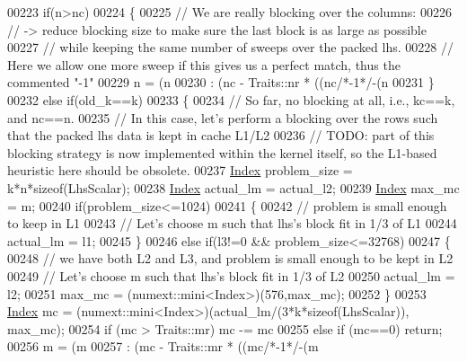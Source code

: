 \begin{DoxyCode}
00223     \textcolor{keywordflow}{if}(n>nc)
00224     \{
00225       \textcolor{comment}{// We are really blocking over the columns:}
00226       \textcolor{comment}{// -> reduce blocking size to make sure the last block is as large as possible}
00227       \textcolor{comment}{//    while keeping the same number of sweeps over the packed lhs.}
00228       \textcolor{comment}{//    Here we allow one more sweep if this gives us a perfect match, thus the commented "-1"}
00229       n = (n%
00230                     : (nc - Traits::nr * ((nc\textcolor{comment}{/*-1*/}-(n%
00231     \}
00232     \textcolor{keywordflow}{else} \textcolor{keywordflow}{if}(old\_k==k)
00233     \{
00234       \textcolor{comment}{// So far, no blocking at all, i.e., kc==k, and nc==n.}
00235       \textcolor{comment}{// In this case, let's perform a blocking over the rows such that the packed lhs data is kept in
       cache L1/L2}
00236       \textcolor{comment}{// TODO: part of this blocking strategy is now implemented within the kernel itself, so the L1-based
       heuristic here should be obsolete.}
00237       \hyperlink{namespace_eigen_a62e77e0933482dafde8fe197d9a2cfde}{Index} problem\_size = k*n*\textcolor{keyword}{sizeof}(LhsScalar);
00238       \hyperlink{namespace_eigen_a62e77e0933482dafde8fe197d9a2cfde}{Index} actual\_lm = actual\_l2;
00239       \hyperlink{namespace_eigen_a62e77e0933482dafde8fe197d9a2cfde}{Index} max\_mc = m;
00240       \textcolor{keywordflow}{if}(problem\_size<=1024)
00241       \{
00242         \textcolor{comment}{// problem is small enough to keep in L1}
00243         \textcolor{comment}{// Let's choose m such that lhs's block fit in 1/3 of L1}
00244         actual\_lm = l1;
00245       \}
00246       \textcolor{keywordflow}{else} \textcolor{keywordflow}{if}(l3!=0 && problem\_size<=32768)
00247       \{
00248         \textcolor{comment}{// we have both L2 and L3, and problem is small enough to be kept in L2}
00249         \textcolor{comment}{// Let's choose m such that lhs's block fit in 1/3 of L2}
00250         actual\_lm = l2;
00251         max\_mc = (numext::mini<Index>)(576,max\_mc);
00252       \}
00253       \hyperlink{namespace_eigen_a62e77e0933482dafde8fe197d9a2cfde}{Index} mc = (numext::mini<Index>)(actual\_lm/(3*k*\textcolor{keyword}{sizeof}(LhsScalar)), max\_mc);
00254       \textcolor{keywordflow}{if} (mc > Traits::mr) mc -= mc %
00255       \textcolor{keywordflow}{else} \textcolor{keywordflow}{if} (mc==0) \textcolor{keywordflow}{return};
00256       m = (m%
00257                     : (mc - Traits::mr * ((mc\textcolor{comment}{/*-1*/}-(m%

\end{DoxyCode}
